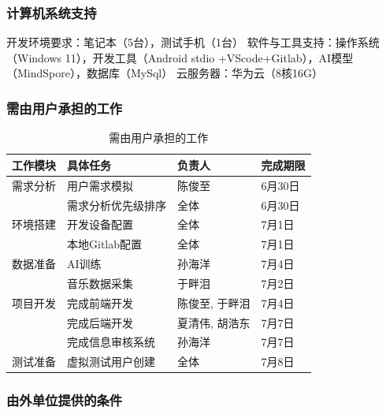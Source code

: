 \documentclass{base}
\begin{document}
\subsubsection{计算机系统支持}

开发环境要求：笔记本（5台），测试手机（1台）
软件与工具支持：操作系统（Windows 11），开发工具（Android stdio +VScode+Gitlab），AI模型（MindSpore），数据库（MySql）
云服务器：华为云（8核16G）

\subsubsection{需由用户承担的工作}

\begin{longtable}{@{}llll@{}}
\caption{需由用户承担的工作}
\label{tab:my-table}\\
\toprule
\textbf{工作模块} & \textbf{具体任务} & \textbf{负责人} & \textbf{完成期限} \\* \midrule
\endhead
%
\bottomrule
\endfoot
%
\endlastfoot
%
需求分析          & 用户需求模拟        & 陈俊至          & 6月30日         \\
              & 需求分析优先级排序     & 全体           & 6月30日         \\
环境搭建          & 开发设备配置        & 全体           & 7月1日          \\
              & 本地Gitlab配置    & 全体           & 7月1日          \\
数据准备          & AI训练          & 孙海洋          & 7月4日          \\
              & 音乐数据采集        & 于畔泪          & 7月2日          \\
项目开发          & 完成前端开发        & 陈俊至, 于畔泪     & 7月4日          \\
              & 完成后端开发        & 夏清伟, 胡浩东     & 7月7日          \\
              & 完成信息审核系统      & 孙海洋          & 7月7日          \\
测试准备          & 虚拟测试用户创建      & 全体           & 7月8日          \\* \bottomrule
\end{longtable}

\subsubsection{由外单位提供的条件}
\end{document}
